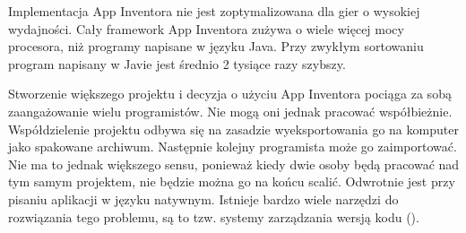 Implementacja App Inventora nie jest zoptymalizowana dla gier o wysokiej wydajności. Cały framework App Inventora zużywa o wiele więcej mocy procesora, niż programy napisane w języku Java. Przy zwykłym sortowaniu program napisany w Javie jest średnio 2 tysiące razy szybszy.

Stworzenie większego projektu i decyzja o użyciu App Inventora pociąga za sobą zaangażowanie wielu programistów. Nie mogą oni jednak pracować współbieżnie. Współdzielenie projektu odbywa się na zasadzie wyeksportowania go na komputer jako spakowane archiwum. Następnie kolejny programista może go zaimportować. Nie ma to jednak większego sensu, ponieważ kiedy dwie osoby będą pracować nad tym samym projektem, nie będzie można go na końcu scalić. Odwrotnie jest przy pisaniu aplikacji w języku natywnym. Istnieje bardzo wiele narzędzi do rozwiązania tego problemu, są to tzw. systemy zarządzania wersją kodu ().
